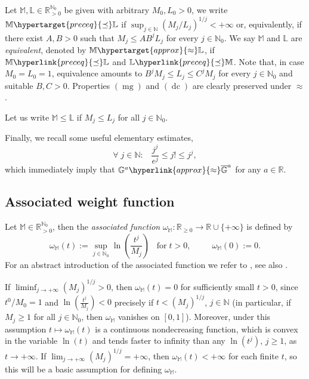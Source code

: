 \documentclass[11pt,a4paper]{article}
\theoremstyle{plain}
\newtheorem{lemma}[proposition]{Lemma}
\theoremstyle{definition}
\newcommand{\RR}{\mathbb{R}}
\newcommand{\NN}{\mathbb{N}}
\newcommand{\M}{\mathbb{M}}
\newcommand{\LL}{\mathbb{L}}
\newcommand{\G}{\mathbb{G}}
\let\on=\operatorname
\begin{document}
Let $\M,\LL\in\RR_{>0}^{\NN_0}$ be given {with arbitrary $M_0,L_0>0$}, we write $\M\hypertarget{preceq}{\preceq}\LL$ if $\sup_{j\in\NN}\left(M_j/L_j\right)^{1/j}<+\infty$ {or, equivalently, if there exist $A,B>0$ such that $M_j\le AB^jL_j$ for every $j\in\NN_0$}. We say $\M$ and $\LL$ are {\itshape equivalent}, denoted by $\M\hypertarget{approx}{\approx}\LL$, if $\M\hyperlink{preceq}{\preceq}\LL$ and $\LL\hyperlink{preceq}{\preceq}\M$.
Note that, in case $M_0=L_0=1$, equivalence amounts to $B^jM_j\le L_j\le C^jM_j$ for every $j\in\NN_0$ and suitable $B,C>0$.
Properties \hyperlink{mg}{$(\on{mg})$} and \hyperlink{dc}{$(\on{dc})$} are clearly preserved under \hyperlink{approx}{$\approx$}. %

Let us write $\M\le \LL$ if $M_j\le L_j$ for all $j\in\NN_0$.\vspace{6pt}

Finally{,} we recall some useful elementary estimates,
\begin{equation}\label{Stirling}
	\forall\;j\in\NN:\;\;\;\frac{j^j}{e^j}\le j!\le j^j,
\end{equation}
which immediately imply that  %
%
 $\G^a\hyperlink{approx}{\approx}\overline{\G}^a$ for any $a\in\RR$.

\subsection{Associated weight function}\label{ssectAssocWeightFunct}
Let $\M\in\RR_{>0}^{\NN_0}$, then the {\itshape associated function} $\omega_\M: \RR_{\ge 0}\rightarrow\RR\cup\{+\infty\}$ is defined by
\begin{equation*}\label{assofunc}
\omega_\M(t):=\sup_{j\in\NN_0}\ln\left(\frac{t^j}{M_j}\right)\;\;\;\text{for}\;t>0,\hspace{30pt}\omega_\M(0):=0.
\end{equation*}
For an abstract introduction of the associated function we refer to \cite[Chapitre I]{mandelbrojtbook}, see also \cite[Definition 3.1]{Komatsu73}. %

If $\liminf_{j\rightarrow+\infty}(M_j)^{1/j}>0$, then $\omega_\M(t)=0$ for sufficiently small $t>0$, since $t^0/M_0=1$ and $\ln\left(\frac{t^j}{M_j}\right)<0$ precisely if $t<(M_j)^{1/j}$, $j\in\NN$ (in particular, if $M_j\ge 1$ for all $j\in\NN_0$, then $\omega_\M$ vanishes on $[0,1]$). Moreover, under this assumption $t\mapsto\omega_\M(t)$ is a continuous nondecreasing function, which is convex in the variable $\ln(t)$ and tends faster to infinity than any $\ln(t^j)$, $j\ge 1$, as $t\rightarrow+\infty$. If $\lim_{j\rightarrow+\infty}(M_j)^{1/j}=+\infty$, then $\omega_\M(t)<+\infty$ for each finite $t$, so this will be a basic assumption for defining $\omega_\M$.\vspace{6pt}
\end{document}
